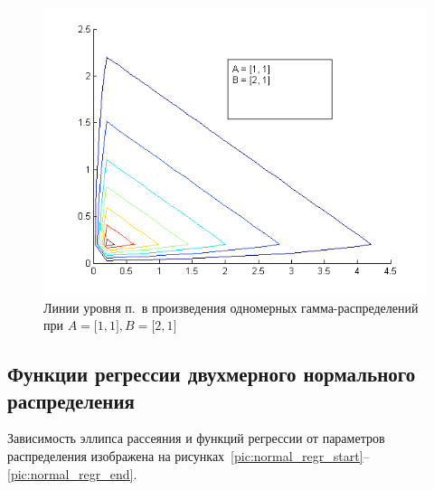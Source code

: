 \begin{figure}[h!]
  \centering
  \includegraphics[width=0.5\linewidth]{pic/gamma_contour_3}
  \caption{Линии уровня п.~в произведения одномерных 
    гамма-распределений при
      $ A = \big[1, 1\big], B = \big[ 2, 1 \big] $}
  \label{pic:gamma_contour_end}
\end{figure}

\newpage

\subsection{Функции регрессии двухмерного
  нормального распределения}

Зависимость эллипса рассеяния и функций регрессии от параметров распределения изображена на рисунках~\ref{pic:normal_regr_start}--\ref{pic:normal_regr_end}.

